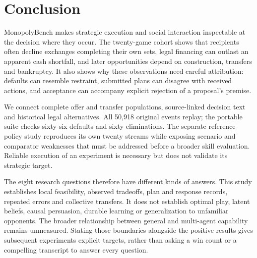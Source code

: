 \section{Conclusion}

MonopolyBench makes strategic execution and social interaction inspectable at the decision where they occur. The twenty-game cohort shows that recipients often decline exchanges completing their own sets, legal financing can outlast an apparent cash shortfall, and later opportunities depend on construction, transfers and bankruptcy. It also shows why these observations need careful attribution: defaults can resemble restraint, submitted plans can disagree with received actions, and acceptance can accompany explicit rejection of a proposal's premise.

We connect complete offer and transfer populations, source-linked decision text and historical legal alternatives. All 50,918 original events replay; the portable suite checks sixty-six defaults and sixty eliminations. The separate reference-policy study reproduces its own twenty streams while exposing scenario and comparator weaknesses that must be addressed before a broader skill evaluation. Reliable execution of an experiment is necessary but does not validate its strategic target.

The eight research questions therefore have different kinds of answers. This study establishes local feasibility, observed tradeoffs, plan and response records, repeated errors and collective transfers. It does not establish optimal play, latent beliefs, causal persuasion, durable learning or generalization to unfamiliar opponents. The broader relationship between general and multi-agent capability remains unmeasured. Stating those boundaries alongside the positive results gives subsequent experiments explicit targets, rather than asking a win count or a compelling transcript to answer every question.

